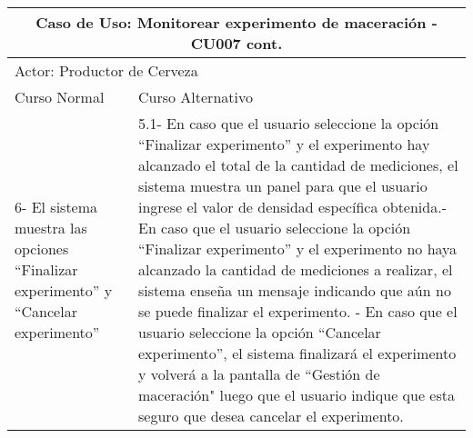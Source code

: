     
    \begin{minipage}{0.95\textwidth}
    \begin{center}
    \begin{tabularx}{\textwidth}{ | X | X |}
    \hline
        \multicolumn{2}{|c|}{\textbf{Caso de Uso: Monitorear experimento de maceración - CU007 cont.}} \\
        \hline
        \multicolumn{2}{|l|}{Actor: Productor de Cerveza} \\
        \hline
    
        Curso Normal & Curso Alternativo \\
        \hline
        
        6- El sistema muestra las opciones ``Finalizar experimento'' y ``Cancelar experimento'' & 5.1- En caso que el usuario seleccione la opción ``Finalizar experimento'' y el experimento hay alcanzado el total de la cantidad de mediciones, el sistema muestra un panel para que el usuario ingrese el valor de densidad específica obtenida.\newline 5.2- En caso que el usuario seleccione la opción ``Finalizar experimento'' y el experimento no haya alcanzado la cantidad de mediciones a realizar, el sistema enseña un mensaje indicando que aún no se puede finalizar el experimento. \newline 5.3- En caso que el usuario seleccione la opción ``Cancelar experimento'', el sistema finalizará el experimento y volverá a la pantalla de ``Gestión de maceración" luego que el usuario indique que esta seguro que desea cancelar el experimento.\\
        \hline

    \end{tabularx}
    \label{CU007_b}
    \end{center}
    \end{minipage}
    
